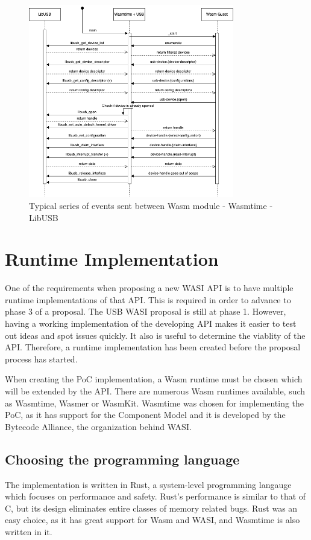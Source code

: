 \begin{figure}[h]
  \centering
  \includegraphics[width=0.8\textwidth]{images/sequentiediagram.png}
  \caption{Typical series of events sent between Wasm module - Wasmtime - LibUSB}
  \label{fig:implementation_overview}
\end{figure}


\section{Runtime Implementation}
One of the requirements when proposing a new \acrshort{WASI} \acrshort{API} is to have multiple runtime implementations of that \acrshort{API}. This is required in order to advance to phase 3 of a proposal. The \acrshort{USB} \acrshort{WASI} proposal is still at phase 1. However, having a working implementation of the developing \acrshort{API} makes it easier to test out ideas and spot issues quickly. It also is useful to determine the viablity of the \acrshort{API}. Therefore, a runtime implementation has been created before the proposal process has started.

When creating the \acrshort{PoC} implementation, a \acrshort{Wasm} runtime must be chosen which will be extended by the \acrshort{API}. There are numerous \acrshort{Wasm} runtimes available, such as Wasmtime, Wasmer or WasmKit. Wasmtime was chosen for implementing the \acrshort{PoC}, as it has support for the Component Model and it is developed by the Bytecode Alliance, the organization behind \acrshort{WASI}.

\subsection{Choosing the programming language}
The implementation is written in Rust, a system-level programming langauge which focuses on performance and safety. Rust's performance is similar to that of C, but its design eliminates entire classes of memory related bugs. Rust was an easy choice, as it has great support for \acrshort{Wasm} and \acrshort{WASI}, and Wasmtime is also written in it.

